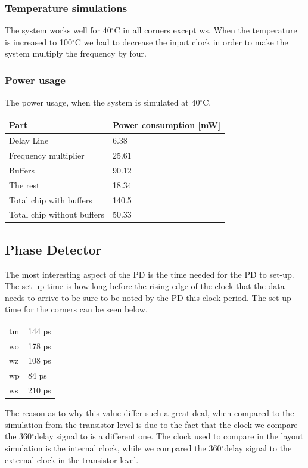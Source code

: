 \documentclass[a4paper,12pt]{article} \usepackage{graphicx}
\newcommand{\degree}{\ensuremath{^\circ}}
\begin{document}
\subsubsection{Temperature simulations}
The system works well for 40\degree C in all corners except ws.
When the temperature is increased to 100\degree C we had to decrease 
the input clock in order to make the system multiply the frequency
by four.

\subsubsection{Power usage}
The power usage, when the system is simulated at 40\degree C.

\begin{tabular}{ l | l }
Part & Power consumption [mW] \\
\hline
Delay Line & 6.38 \\
Frequency multiplier & 25.61 \\
Buffers & 90.12 \\
The rest & 18.34 \\ \hline
Total chip with buffers & 140.5 \\
Total chip without buffers & 50.33
\end{tabular}

\subsection{Phase Detector}
The most interesting aspect of the PD is the time needed for the PD to set-up.
 The set-up time is how long before the rising edge of the clock that the data
 needs to arrive to be sure to be noted by the PD this clock-period. The set-up
 time for the corners can be seen below.
 
\begin{tabular}{l l}
tm & 144 ps \\
wo & 178 ps \\
wz & 108 ps \\
wp & 84 ps \\
ws & 210 ps
\end{tabular}

The reason as to why this value differ such a great deal, when compared 
to the simulation from the transistor level is due to the fact that the 
clock we compare the 360\degree delay signal to is a different one.
The clock used to compare in the layout simulation is the internal clock, while 
we compared the 360\degree delay signal to the external clock in the transistor level.
\end{document}
